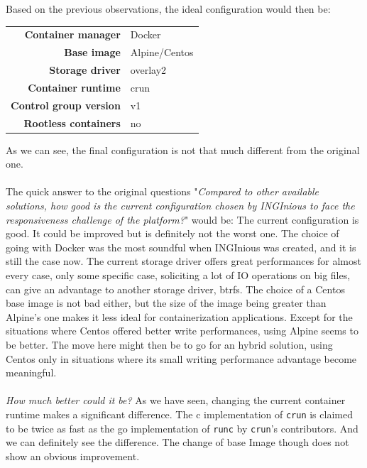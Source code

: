 Based on the previous observations, the ideal configuration would then be:

\begin{center}
\begin{tabular}{rl}
  \textbf{Container manager} & Docker \\
  \textbf{Base image} & Alpine/Centos \\
  \textbf{Storage driver} & overlay2 \\
  \textbf{Container runtime} & crun \\
  \textbf{Control group version} & v1 \\
  \textbf{Rootless containers} & no \\
\end{tabular}
\end{center}

As we can see, the final configuration is not that much different from the original one.  
\paragraph{}The quick answer to the original questions "\textit{Compared to other available solutions, how good is the current configuration chosen by INGInious to face the responsiveness challenge of the platform?}" would be:
The current configuration is good.  It could be improved but is definitely not the worst one.  The choice of going with Docker was the most soundful when INGInious was created, and it is still the case now.  The current storage driver offers great performances for almost every case, only some specific case, soliciting a lot of IO operations on big files, can give an advantage to another storage driver, btrfs.  The choice of a Centos base image is not bad either, but the size of the image being greater than Alpine's one makes it less ideal for containerization applications.  Except for the situations where Centos offered better write performances, using Alpine seems to be better.  The move here might then be to go for an hybrid solution, using Centos only in situations where its small writing performance advantage become meaningful.  
\paragraph{}\textit{How much better could it be?}  As we have seen, changing the current container runtime makes a significant difference.  The c implementation of \texttt{crun} is claimed to be twice as fast as the go implementation of \texttt{runc} by \texttt{crun}'s contributors.  And we can definitely see the difference.  The change of base Image though does not show an obvious improvement.
